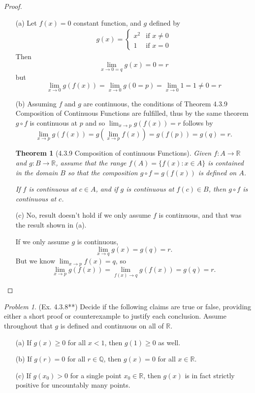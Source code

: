 \documentclass[11pt,twoside, reqno]{amsart}
\newtheorem{Thm}{Theorem}
\theoremstyle{remark}
\newtheorem{Prob}{Problem}
\def\R{\mathbb R}
\def\Q{\mathbb Q}
\begin{document}
\begin{proof}
\begin{enumerate}
    \item [(a)] Let $f(x) = 0$ constant function, and $g$ defined by
    \begin{align*}
        g(x) =
            \begin{cases}
                x^2 & \text{if $x \neq 0$} \\
                1 & \text{if $x = 0$}
            \end{cases}
    \end{align*}
    Then
    $$
        \lim_{x \to 0 = q} g(x) = 0 = r    
    $$
    but
    $$
        \lim_{x \to 0} g(f(x)) = \lim_{x \to 0} g(0 = p) = \lim_{x \to 0} 1 = 1 \neq 0 = r
    $$
    \item [(b)] Assuming $f$ and $g$ are continuous, the conditions of Theorem 4.3.9 Composition of Continuous Functions are fulfilled, thus by the same theorem $g \circ f$ is continuous at $p$ and so $\lim_{x \to p} g(f(x)) = r$ follows by
    $$
        \lim_{x \to p} g(f(x)) = g(\lim_{x \to p} f(x)) = g(f(p)) = g(q) = r.
    $$
    \begin{Thm} [4.3.9 Composition of continuous Functions]
        Given $f : A \to \R$ and $g : B \to \R$, assume that the range $f(A) = \{f(x) : x \in A\}$ is contained in the domain $B$ so that the composition $g \circ f = g(f(x))$ is defined on $A$.
        
        If $f$ is continuous at $c \in A$, and if $g$ is continuous at $f(c) \in B$, then $g \circ f$ is continuous at $c$.
    \end{Thm}
    \item [(c)] No, result doesn't hold if we only assume $f$ is continuous, and that was the result shown in (a).
    
    If we only assume $g$ is continuous,
    $$
        \lim_{x \to q} g(x) = g(q) = r.
    $$
    But we know $\lim_{x \to p} f(x) = q$, so
    $$
        \lim_{x \to p} g(f(x)) = \lim_{f(x) \to q} g(f(x)) = g(q) = r.    
    $$
\end{enumerate}

\end{proof}

\begin{Prob}(Ex. 4.3.8**) Decide if the following claims are true or false, providing either a short proof or counterexample to justify each conclusion. Assume throughout that $g$ is defined and continuous on all of $\R$.
\begin{enumerate}
    \item [(a)] If $g(x) \geq 0$ for all $x < 1$, then $g(1) \geq 0$ as well.
    \item [(b)] If $g(r) = 0$ for all $r \in \Q$, then $g(x) = 0$ for all $x \in \R$.
    \item [(c)] If $g(x_0) > 0$ for a single point $x_0 \in \R$, then $g(x)$ is in fact strictly positive for uncountably many points.
\end{enumerate}
\end{Prob}
\end{document}

